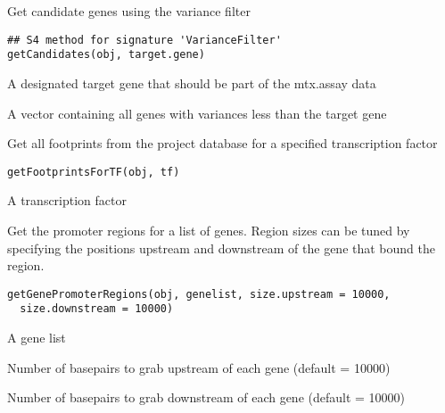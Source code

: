 \documentclass[a4paper]{book}
\begin{document}
%
\begin{Description}\relax
Get candidate genes using the variance filter
\end{Description}
%
\begin{Usage}
\begin{verbatim}
## S4 method for signature 'VarianceFilter'
getCandidates(obj, target.gene)
\end{verbatim}
\end{Usage}
%
\begin{Arguments}
\begin{ldescription}
\item[\code{target.gene}] A designated target gene that should be part of the mtx.assay data
\end{ldescription}
\end{Arguments}
%
\begin{Value}
A vector containing all genes with variances less than the target gene
\end{Value}
%
\begin{Description}\relax
Get all footprints from the project database for a specified transcription factor
\end{Description}
%
\begin{Usage}
\begin{verbatim}
getFootprintsForTF(obj, tf)
\end{verbatim}
\end{Usage}
%
\begin{Arguments}
\begin{ldescription}
\item[\code{tf}] A transcription factor
\end{ldescription}
\end{Arguments}
%
\begin{Description}\relax
Get the promoter regions for a list of genes. Region sizes can be tuned by specifying
the positions upstream and downstream of the gene that bound the region.
\end{Description}
%
\begin{Usage}
\begin{verbatim}
getGenePromoterRegions(obj, genelist, size.upstream = 10000,
  size.downstream = 10000)
\end{verbatim}
\end{Usage}
%
\begin{Arguments}
\begin{ldescription}
\item[\code{genelist}] A gene list

\item[\code{size.upstream}] Number of basepairs to grab upstream of each gene (default = 10000)

\item[\code{size.downstream}] Number of basepairs to grab downstream of each gene (default = 10000)
\end{ldescription}
\end{Arguments}
\end{document}
